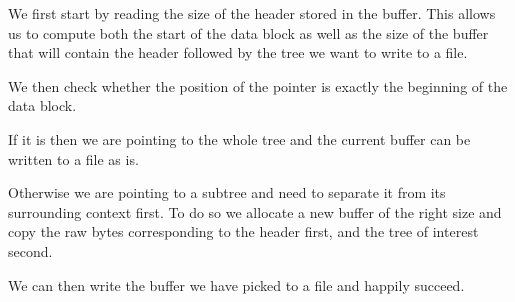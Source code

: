 
We first start by reading the size of the header stored in the buffer.
%
This allows us to compute both the start of the data block as well as the
size of the buffer that will contain the header followed by the tree we want
to write to a file.


We then check whether the position of the pointer is exactly the beginning
of the data block.

If it is then we are pointing to the whole tree and the current buffer can
be written to a file as is.

Otherwise we are pointing to a subtree and need to separate it from its
surrounding context first.
%
To do so we allocate a new buffer of the right size and copy the raw bytes
corresponding to the header first, and the tree of interest second.

We can then write the buffer we have picked to a file and happily succeed.
